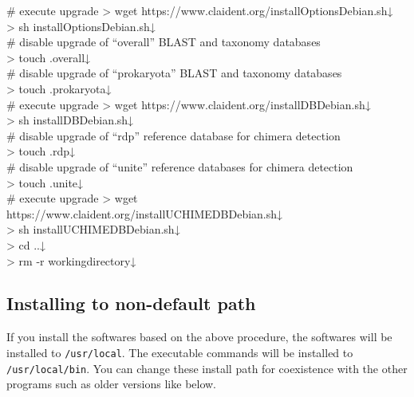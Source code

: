 \documentclass[titlepage,10pt,a4paper,english]{jsbook}
\newenvironment{cmd}{\begin{oframed}\raggedright\ttfamily\footnotesize\setlength{\baselineskip}{1.4em}}{\end{oframed}\vspace{-1em}}
\begin{document}
\begin{cmd}
\# execute upgrade
{\textgreater} wget https://www.claident.org/installOptions{\textunderscore}Debian.sh↓\\
{\textgreater} sh installOptions{\textunderscore}Debian.sh↓\\
\# disable upgrade of ``overall'' BLAST and taxonomy databases\\
{\textgreater} touch .overall↓\\
\# disable upgrade of ``prokaryota'' BLAST and taxonomy databases\\
{\textgreater} touch .prokaryota↓\\
\# execute upgrade
{\textgreater} wget https://www.claident.org/installDB{\textunderscore}Debian.sh↓\\
{\textgreater} sh installDB{\textunderscore}Debian.sh↓\\
\# disable upgrade of ``rdp'' reference database for chimera detection\\
{\textgreater} touch .rdp↓\\
\# disable upgrade of ``unite'' reference databases for chimera detection\\
{\textgreater} touch .unite↓\\
\# execute upgrade
{\textgreater} wget https://www.claident.org/installUCHIMEDB{\textunderscore}Debian.sh↓\\
{\textgreater} sh installUCHIMEDB{\textunderscore}Debian.sh↓\\
{\textgreater} cd ..↓\\
{\textgreater} rm -r workingdirectory↓
\end{cmd}

\subsection{Installing to non-default path}

If you install the softwares based on the above procedure, the softwares will be installed to \texttt{/usr/local}. The executable commands will be installed to \texttt{/usr/local/bin}. You can change these install path for coexistence with the other programs such as older versions like below.
\end{document}
